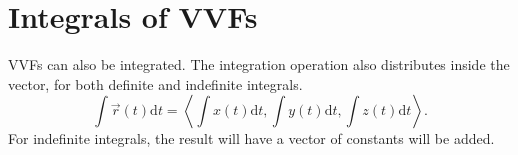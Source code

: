 \section{Integrals of VVFs}
VVFs can also be integrated.
The integration operation also distributes inside the vector, for both definite and indefinite integrals.
\begin{equation*}
	\int{\vec{r}(t)\mathrm{d}t} = \left<\int{x(t)\mathrm{d}t},\int{y(t)\mathrm{d}t},\int{z(t)\mathrm{d}t}\right>.
\end{equation*}
For indefinite integrals, the result will have a vector of constants will be added.